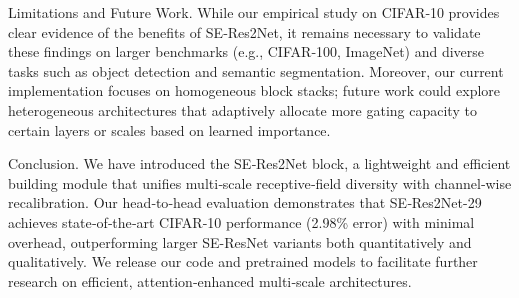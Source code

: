 \documentclass{article}
\begin{document}
Limitations and Future Work. While our empirical study on CIFAR‐10 provides clear evidence of the benefits of SE‐Res2Net, it remains necessary to validate these findings on larger benchmarks (e.g., CIFAR‐100, ImageNet) and diverse tasks such as object detection and semantic segmentation. Moreover, our current implementation focuses on homogeneous block stacks; future work could explore heterogeneous architectures that adaptively allocate more gating capacity to certain layers or scales based on learned importance.

Conclusion. We have introduced the SE‐Res2Net block, a lightweight and efficient building module that unifies multi‐scale receptive‐field diversity with channel‐wise recalibration. Our head‐to‐head evaluation demonstrates that SE‐Res2Net-29 achieves state‐of‐the‐art CIFAR‐10 performance (2.98\% error) with minimal overhead, outperforming larger SE-ResNet variants both quantitatively and qualitatively. We release our code and pretrained models to facilitate further research on efficient, attention‐enhanced multi‐scale architectures.
\end{document}
